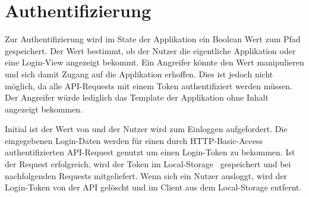 \section{Authentifizierung}
\label{sec:f_authentifizierung}

Zur Authentifizierung wird im State der Applikation ein Boolean Wert zum
Pfad  gespeichert.  Der Wert bestimmt, ob der Nutzer
die eigentliche Applikation oder eine Login-View angezeigt bekommt.
Ein Angreifer könnte den Wert manipulieren und sich damit Zugang auf die
Applikation erhoffen.  Dies ist jedoch nicht möglich, da alle API-Requests mit
einem Token authentifiziert werden müssen.  Der Angreifer würde lediglich das
Template der Applikation ohne Inhalt angezeigt bekommen.

Initial ist der Wert von   und der Nutzer
wird zum Einloggen aufgefordert.  Die eingegebenen Login-Daten werden für einen
durch HTTP-Basic-Access~\cite{RFC2617} authentifizierten API-Request genutzt um
einen Login-Token zu bekommen.  Ist der Request erfolgreich, wird der Token im
Local-Storage~\cite{web-storage} gespeichert und bei nachfolgenden Requests
mitgeliefert.  Wenn sich ein Nutzer ausloggt, wird der Login-Token von der API
gelöscht und im Client aus dem Local-Storage entfernt.
